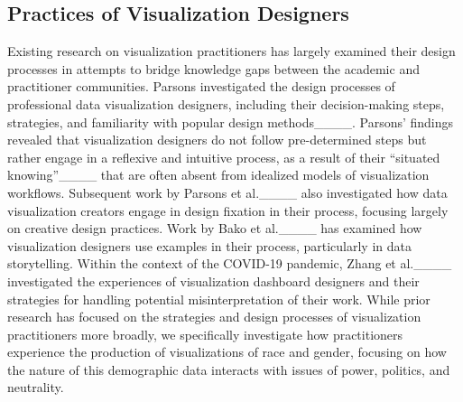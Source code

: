 \subsection{Practices of Visualization Designers}
Existing research on visualization practitioners has largely examined their design processes in attempts to bridge knowledge gaps between the academic and practitioner communities. Parsons investigated the design processes of professional data visualization designers, including their decision-making steps, strategies, and familiarity with popular design methods____. Parsons' findings revealed that visualization designers do not follow pre-determined steps but rather engage in a reflexive and intuitive process, as a result of their ``situated knowing''____ that are often absent from idealized models of visualization workflows. Subsequent work by Parsons et al.____ also investigated how data visualization creators engage in design fixation in their process, focusing largely on creative design practices. Work by Bako et al.____ has examined how visualization designers use examples in their process, particularly in data storytelling. Within the context of the COVID-19 pandemic, Zhang et al.____ investigated the experiences of visualization dashboard designers and their strategies for handling potential misinterpretation of their work. While prior research has focused on the strategies and design processes of visualization practitioners more broadly, we specifically investigate how practitioners experience the production of visualizations of race and gender, focusing on how the nature of this demographic data interacts with issues of power, politics, and neutrality.
%